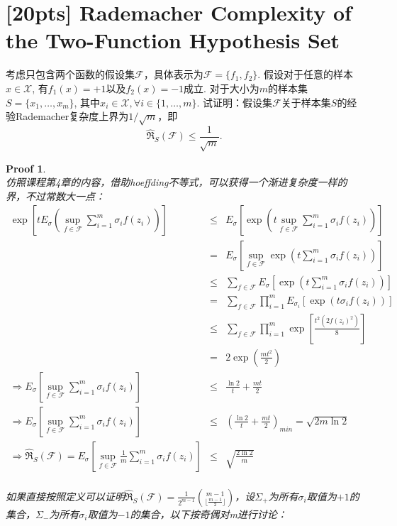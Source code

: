 \documentclass[a4paper,UTF8]{article}
\numberwithin{equation}{section}
\newtheorem*{myProof}{Proof}
\begin{document}
\newpage
\section{[20pts] Rademacher Complexity of the Two-Function Hypothesis Set}
考虑只包含两个函数的假设集$\mathcal{F}$，具体表示为$\mathcal{F} = \{f_1,f_2\}$. 假设对于任意的样本$x \in \mathcal{X}$, 有$f_1(x) = +1$以及$f_2(x) = -1$成立. 对于大小为$m$的样本集$S = \{x_1,\ldots,x_m\}$, 其中$x_i \in \mathcal{X}, \forall i \in \{1,\ldots,m\}$. 试证明：假设集$\mathcal{F}$关于样本集$S$的经验Rademacher复杂度上界为$1/\sqrt{m}$，即
\begin{equation}
	\label{eq:upper-bound-empirical-Rad}
	\hat{\mathfrak{R}}_S(\mathcal{F}) \leq \frac{1}{\sqrt{m}}.
\end{equation}

\begin{myProof}~\\
仿照课程第4章的内容，借助hoeffding不等式，可以获得一个渐进复杂度一样的界，不过常数大一点：
\begin{eqnarray*}
\exp[tE_{\sigma}(\sup_{f \in \mathcal{\mathcal{F}}} \sum_{i = 1}^m \sigma_i f(z_i))] &\le& E_{\sigma}[\exp(t\sup_{f \in \mathcal{F}} \sum_{i = 1}^m \sigma_i f(z_i))] \\
&=& E_{\sigma}[\sup_{f \in \mathcal{F}}\exp(t \sum_{i = 1}^m \sigma_i f(z_i))] \\
&\le& \sum_{f\in \mathcal{F}} E_{\sigma}[\exp(t \sum_{i = 1}^m \sigma_i f(z_i))] \\
&=& \sum_{f\in \mathcal{F}} \prod_{i=1}^m E_{\sigma_i}[\exp(t \sigma_i f(z_i))] \\
&\le& \sum_{f\in \mathcal{F}} \prod_{i=1}^m \exp [\frac{t^2(2f(z_i)^2)}{8}] \\
&=& 2\exp(\frac{mt^2}{2}) \\
\Longrightarrow E_{\sigma}[\sup_{f \in \mathcal{F}} \sum_{i = 1}^m \sigma_i f(z_i)] &\le& \frac{\ln2}{t} + \frac{mt}{2} \\
\Longrightarrow E_{\sigma}[\sup_{f \in \mathcal{F}} \sum_{i = 1}^m \sigma_i f(z_i)] &\le& (\frac{\ln2}{t} + \frac{mt}{2})_{min} = \sqrt{2m\ln2} \\
\Longrightarrow \hat{\mathfrak{R}}_S(\mathcal{F}) = E_{\sigma}[\sup_{f \in \mathcal{F}} \frac{1}{m} \sum_{i = 1}^m \sigma_i f(z_i)] &\le& \sqrt{\frac{2\ln2}{m}} \\
\end{eqnarray*}

如果直接按照定义可以证明$\hat{\mathfrak{R}}_S(\mathcal{F}) = \frac{1}{2^{m-1}} \binom{m-1}{\lfloor \frac{m-1}{2} \rfloor}$，设$\Sigma_+$为所有$\sigma_i$取值为$+1$的集合，$\Sigma_-$为所有$\sigma_i$取值为$-1$的集合，以下按奇偶对m进行讨论：


\end{myProof}
\end{document}
